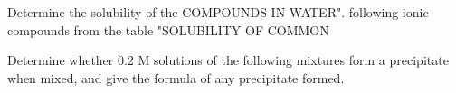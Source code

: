 \documentclass[fleqn]{exam}
\begin{document}
\begin{questions}
  \setcounter{question}{20}
  \question Determine the solubility of the COMPOUNDS IN WATER". following ionic compounds from the table "SOLUBILITY OF COMMON
  \newpage
  \question Determine whether 0.2 M solutions of the following mixtures form a precipitate when mixed, and give the formula of any precipitate formed.
  \begin{parts}

\end{parts}
\end{questions}
\end{document}
